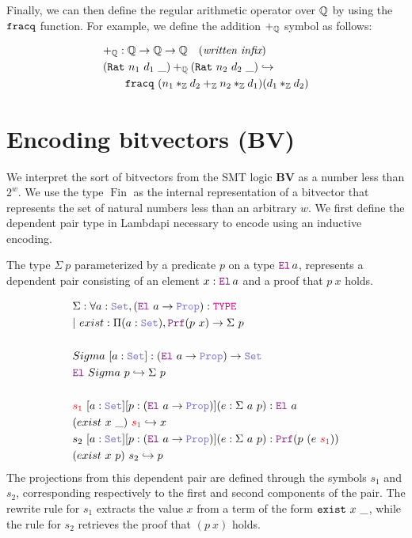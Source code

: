 Finally, we can then define the regular arithmetic operator over $\mathbb{Q}$ by using the $\texttt{\upshape{fracq}}$ function.
For example, we define the addition $+_{\mathbb{Q}}$ symbol as follows:

\begin{align*}
&+_{\mathbb{Q}} : \mathbb{Q} \rightarrow \mathbb{Q} \rightarrow \mathbb{Q} \quad (\textit{written infix})\\
&(\texttt{\upshape{Rat}}~n_1~d_1~\_) +_{\mathbb{Q}} (\texttt{\upshape{Rat}}~n_2~d_2~\_) \hookrightarrow\\
&\qquad \texttt{\upshape{fracq}}~(n_1 *_{\mathbb{Z}} d_2 +_{\mathbb{Z}} n_2 *_{\mathbb{Z}} d_1) (d_1 *_{\mathbb{Z}} d_2) \\
\end{align*}


\section{Encoding bitvectors (\textbf{\uppercase{BV}})}
\label{ssec:encoding-bv}

We interpret the sort of bitvectors  from the SMT logic \textbf{BV} as a number less than $2^w$. We use the type $\mathop{Fin}$ as the internal representation of a bitvector
that represents the set of natural numbers less than an arbitrary $w$. We first define the dependent pair type in Lambdapi necessary to encode  using an inductive encoding.

\begin{definition}\label{dep-pair-def}
The type $\Sigma~p$ parameterized by a predicate $p$ on a type $\el\,a$, represents a dependent pair consisting of an element $x : \el\,a$ and a proof that $p~x$ holds.

\begin{align*}
&\Sigma : \forall a : \set{}, (\el{}~a \ra \prop): \type \\
&|~exist : \Pi (a : \set{}), \prf (p~x) \ra \Sigma~p \\
&\\
& Sigma~[a: \set{}]: (\el{}~a \ra \prop) \ra \set{} \\
& \el{}~Sigma~p \re \Sigma~p \\
&\\
& \textcolor{red}{s_1}~[a: \set{}] [p:(\el{}~a \ra \prop)] (e: \Sigma~a~p): \el{}~a \\
& (exist~x~\_)~\textcolor{red}{s_1} \re x\\
& s_2~[a: \set{}] [p:(\el{}~a \ra \prop)] (e: \Sigma~a~p): \prf{}(p~(e~\textcolor{red}{s_1})) \\
& (exist~x~p)~s_2 \re p\\
\end{align*}
The projections from this dependent pair are defined through the symbols $s_1$ and $s_2$, corresponding respectively to the first and second components of the pair.
The rewrite rule for $s_1$ extracts the value $x$ from a term of the form $\texttt{\upshape{exist}}~x~\_$, while the rule for $s_2$ retrieves the proof that $(p~x)$ holds.
\end{definition}

